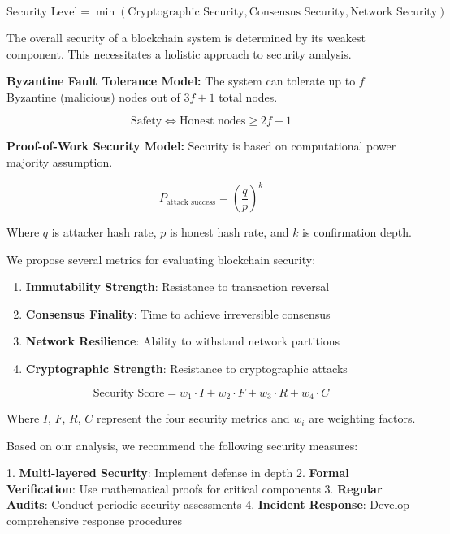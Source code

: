 \documentclass{article}
\begin{document}
{\begin{equation}
\text{Security Level} = \min(\text{Cryptographic Security}, \text{Consensus Security}, \text{Network Security})
\end{equation}

The overall security of a blockchain system is determined by its weakest component. This necessitates a holistic approach to security analysis.

\textbf{Byzantine Fault Tolerance Model:}
The system can tolerate up to $f$ Byzantine (malicious) nodes out of $3f+1$ total nodes.

\begin{equation}
\text{Safety} \Leftrightarrow \text{Honest nodes} \geq 2f+1
\end{equation}

\textbf{Proof-of-Work Security Model:}
Security is based on computational power majority assumption.

\begin{equation}
P_{\text{attack success}} = \left(\frac{q}{p}\right)^k
\end{equation}

Where $q$ is attacker hash rate, $p$ is honest hash rate, and $k$ is confirmation depth.

We propose several metrics for evaluating blockchain security:

\begin{enumerate}
\item \textbf{Immutability Strength}: Resistance to transaction reversal
\item \textbf{Consensus Finality}: Time to achieve irreversible consensus
\item \textbf{Network Resilience}: Ability to withstand network partitions
\item \textbf{Cryptographic Strength}: Resistance to cryptographic attacks
\end{enumerate}

\begin{equation}
\text{Security Score} = w_1 \cdot I + w_2 \cdot F + w_3 \cdot R + w_4 \cdot C
\end{equation}

Where $I$, $F$, $R$, $C$ represent the four security metrics and $w_i$ are weighting factors.

Based on our analysis, we recommend the following security measures:

1. \textbf{Multi-layered Security}: Implement defense in depth
2. \textbf{Formal Verification}: Use mathematical proofs for critical components
3. \textbf{Regular Audits}: Conduct periodic security assessments
4. \textbf{Incident Response}: Develop comprehensive response procedures

}
\end{document}
